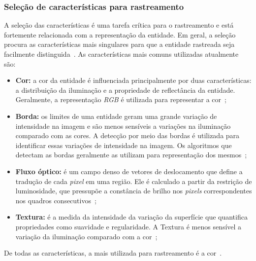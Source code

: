 
\subsubsection{Seleção de características para rastreamento}

	A seleção das características é uma tarefa crítica para o rastreamento e está fortemente relacionada com a representação da entidade. Em geral, a seleção procura as características mais singulares para que a entidade rastreada seja facilmente distinguida~\cite{yilmaz}. As características mais comuns utilizadas atualmente são:

	\begin{itemize}
		\item \textbf{Cor:} a cor da entidade é influenciada principalmente por duas
		características: a distribuição da iluminação e a propriedade de reflectância da
		entidade. Geralmente, a representação \textit{RGB} é utilizada para representar
		a cor~\cite{yilmaz};

		\item \textbf{Borda:} os limites de uma entidade geram uma grande variação de
		intensidade na imagem e são menos sensíveis a variações na iluminação comparado
		com as cores. A detecção por meio das bordas é utilizada para identificar essas
		variações de intensidade na imagem. Os algoritmos que detectam as bordas
		geralmente as utilizam para representação dos mesmos~\cite{yilmaz};

		\item \textbf{Fluxo óptico:} é um campo denso de vetores de deslocamento que
		define a tradução de cada \textit{pixel} em uma região. Ele é calculado a
		partir da restrição de luminosidade, que pressupõe a constância de brilho nos
		\textit{pixels} correspondentes nos quadros consecutivos~\cite{yilmaz,
		horn};

		\item \textbf{Textura:} é a medida da intensidade da variação da superfície que
		quantifica propriedades como suavidade e regularidade. A Textura é menos
		sensível a variação da iluminação comparado com a cor~\cite{yilmaz};

	\end{itemize}

De todas as características, a mais utilizada para rastreamento é a cor~\cite{yilmaz}.


